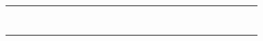 \documentclass[12pt,a4paper]{article}
\begin{document}
\begin{landscape}
\begin{table}[ht!]
\begin{tabular}{|l|l|l|l|l|l|l|l|l|l|l|l|l|l|l|l|l|l|l|l|l|l|l|l|l|l|}
			                               &                                          &    &    &    &    &    &    &    &    &     &     &     &     &     &     &     &     &     &     &     &           \\\hline
			                               &                                          &    &    &    &    &    &    &    &    &     &     &     &     &     &     &     &     &     &     &     &           \\\hline
			                               &                                          &    &    &    &    &    &    &    &    &     &     &     &     &     &     &     &     &     &     &     &           \\\hline
			                               &                                          &    &    &    &    &    &    &    &    &     &     &     &     &     &     &     &     &     &     &     &           \\\hline
			                               &                                          &    &    &    &    &    &    &    &    &     &     &     &     &     &     &     &     &     &     &     &           \\\hline
			                               &                                          &    &    &    &    &    &    &    &    &     &     &     &     &     &     &     &     &     &     &     &           \\\hline
			                               &                                          &    &    &    &    &    &    &    &    &     &     &     &     &     &     &     &     &     &     &     &           \\\hline
			                               &                                          &    &    &    &    &    &    &    &    &     &     &     &     &     &     &     &     &     &     &     &           \\\hline
			                               &                                          &    &    &    &    &    &    &    &    &     &     &     &     &     &     &     &     &     &     &     &           \\\hline
		\end{tabular}
	\end{table}
\end{landscape}
\end{document}
